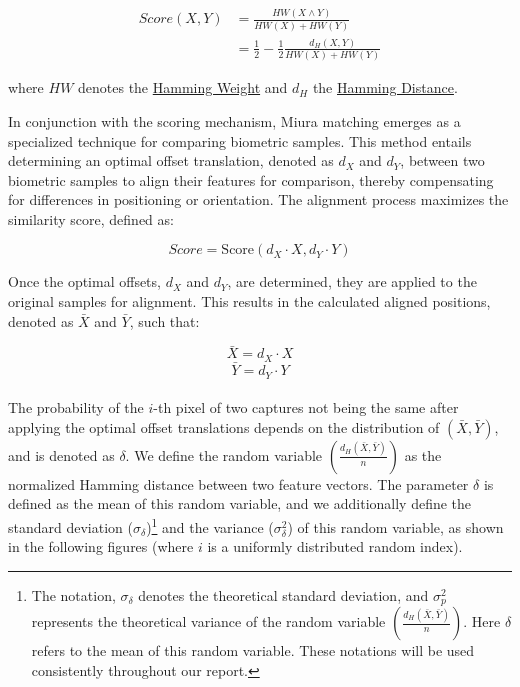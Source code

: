 \begin{equation} \label{eq:score}
    \begin{aligned}
        Score(X, Y) &= \frac{HW(X \land Y)}{HW(X) + HW(Y)}\\
        &= \frac{1}{2}-\frac{1}{2}\frac{d_H(X, Y)}{HW(X) + HW(Y)}
    \end{aligned}
\end{equation}

where \(HW\) denotes the \hyperref[def:Hamming Weight]{Hamming Weight} and \(d_H\) the \hyperref[def:Hamming Distance]{Hamming Distance}. 

In conjunction with the scoring mechanism, Miura matching emerges as a specialized technique for comparing biometric samples. This method entails determining an optimal offset translation, denoted as \(d_X\) and \(d_Y\), between two biometric samples to align their features for comparison, thereby compensating for differences in positioning or orientation. The alignment process maximizes the similarity score, defined as:

\[Score = \text{Score}(d_X \cdot X, d_Y \cdot Y)\]

Once the optimal offsets, \(d_X\) and \(d_Y\), are determined, they are applied to the original samples for alignment. This results in the calculated aligned positions, denoted as \(\bar{X}\) and \(\bar{Y}\), such that:

\[\bar{X} = d_X \cdot X\]
\[\bar{Y} = d_Y \cdot Y\]\\

\newpage
The probability of the \(i\)-th pixel of two captures not being the same after applying the optimal offset translations depends on the distribution of \((\bar{X}, \bar{Y})\), and is denoted as \(\delta\). We define the random variable \(\left( \frac{d_H(\bar{X}, \bar{Y})}{n} \right)\) as the normalized Hamming distance between two feature vectors. The parameter \(\delta\) is defined as the mean of this random variable, and we additionally define the standard deviation (\(\sigma_{\delta}\))\footnote{The notation, \(\sigma_{\delta}\) denotes the theoretical standard deviation, and \(\sigma^2_p \) represents the theoretical variance of the random variable \(\left( \frac{d_H(\bar{X}, \bar{Y})}{n} \right)\). Here $\delta$ refers to the mean of this random variable. These notations will be used consistently throughout our report.} and the variance (\(\sigma^2_{\delta}\)) of this random variable, as shown in the following figures (where \(i\) is a uniformly distributed random index).


